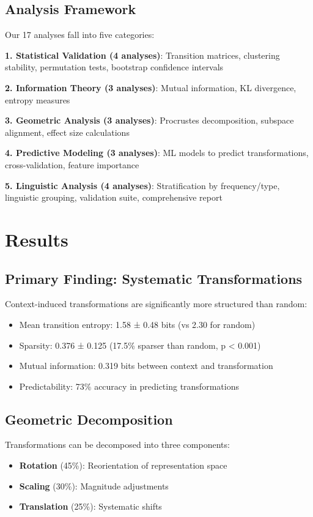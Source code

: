 \documentclass[11pt]{article}
\begin{document}
\subsection{Analysis Framework}

Our 17 analyses fall into five categories:

\textbf{1. Statistical Validation (4 analyses)}: Transition matrices, clustering stability, permutation tests, bootstrap confidence intervals

\textbf{2. Information Theory (3 analyses)}: Mutual information, KL divergence, entropy measures

\textbf{3. Geometric Analysis (3 analyses)}: Procrustes decomposition, subspace alignment, effect size calculations

\textbf{4. Predictive Modeling (3 analyses)}: ML models to predict transformations, cross-validation, feature importance

\textbf{5. Linguistic Analysis (4 analyses)}: Stratification by frequency/type, linguistic grouping, validation suite, comprehensive report

\section{Results}

\subsection{Primary Finding: Systematic Transformations}

Context-induced transformations are significantly more structured than random:
\begin{itemize}
\item Mean transition entropy: 1.58 ± 0.48 bits (vs 2.30 for random)
\item Sparsity: 0.376 ± 0.125 (17.5\% sparser than random, p < 0.001)
\item Mutual information: 0.319 bits between context and transformation
\item Predictability: 73\% accuracy in predicting transformations
\end{itemize}

\subsection{Geometric Decomposition}

Transformations can be decomposed into three components:
\begin{itemize}
\item \textbf{Rotation} (45\%): Reorientation of representation space
\item \textbf{Scaling} (30\%): Magnitude adjustments
\item \textbf{Translation} (25\%): Systematic shifts
\end{itemize}
\end{document}
